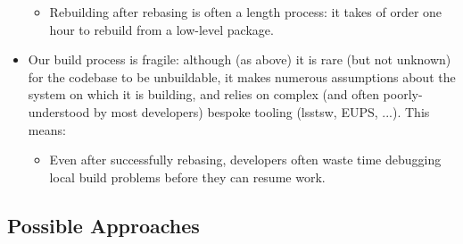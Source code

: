 \documentclass[letterpaper]{scrartcl}
\begin{document}
\begin{itemize}
{\begin{itemize}
      \item{Rebuilding after rebasing is often a length process: it takes of
      order one hour to rebuild from a low-level package.}

    \end{itemize}

  }

  \item{Our build process is fragile: although (as above) it is rare (but not
  unknown) for the codebase to be unbuildable, it makes numerous assumptions
  about the system on which it is building, and relies on complex (and often
  poorly-understood by most developers) bespoke tooling (lsstsw, EUPS, ...).
  This means:

    \begin{itemize}

      \item{Even after successfully rebasing, developers often waste time
      debugging local build problems before they can resume work.}

    \end{itemize}

  }

\end{itemize}

\subsection{Possible Approaches}
\end{document}
